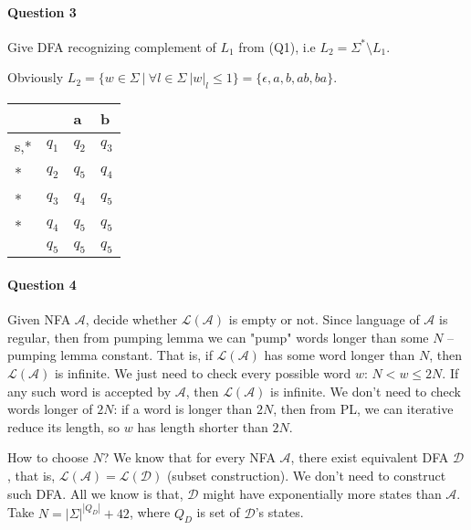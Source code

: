 \paragraph{Question 3}
Give DFA recognizing complement of $L_1$ from (Q1), i.e $L_2 = \Sigma^* \setminus L_1$.

Obviously $L_2 = \{w\in \Sigma \:|\: \forall l\in \Sigma \: |w|_l \leq 1\} = \{\epsilon, a, b, ab, ba\}$.
\begin{table}[!h]
\centering
\begin{tabular}{ll||l|l}
    &    & a  & b  \\
    \hline
s,* & $q_1$ & $q_2$ & $q_3$ \\
*   & $q_2$ & $q_5$ & $q_4$ \\
*   & $q_3$ & $q_4$ & $q_5$ \\
*   & $q_4$ & $q_5$ & $q_5$ \\
    & $q_5$ & $q_5$ & $q_5$
\end{tabular}
\end{table}

\paragraph{Question 4}
Given NFA $\mathcal{A}$, decide whether  $\mathcal{L(A)}$ is empty or not.
Since language of $\mathcal{A}$ is regular, then from pumping lemma we can "pump" words longer than some $N$ – pumping lemma constant.
That is, if $\mathcal{L(A)}$ has some word longer than $N$, then $\mathcal{L(A)}$ is infinite.
We just need to check every possible word $w$: $N < w \leq 2N$.
If any such word is accepted by $\mathcal{A}$, then $\mathcal{L(A)}$ is infinite.
We don't need to check words longer of $2N$: if a word is longer than $2N$, then from PL, we can iterative reduce its length, so $w$ has length shorter than $2N$.

How to choose $N$? We know that for every NFA $\mathcal{A}$, there exist equivalent DFA $\mathcal{D}$, that is, $\mathcal{L(A)} = \mathcal{L(D)}$ (subset construction).
We don't need to construct such DFA.
All we know is that, $\mathcal{D}$ might have exponentially more states than $\mathcal{A}$.
Take $N = |\Sigma|^{|Q_D|} + 42$, where $Q_D$ is set of $\mathcal{D}$'s states.